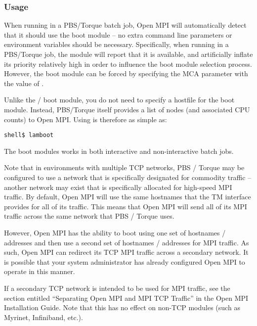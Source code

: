 
\subsubsection{Usage}

When running in a PBS/Torque batch job, Open MPI will automatically detect
that it should use the  boot module -- no extra command line
parameters or environment variables should be necessary.
%
Specifically, when running in a PBS/Torque job, the  module
will report that it is available, and artificially inflate its
priority relatively high in order to influence the boot module
selection process.
%
However, the  boot module can be forced by specifying the
 MCA parameter with the value of .

Unlike the / boot module, you do not need to specify
a hostfile for the  boot module.  Instead, PBS/Torque itself
provides a list of nodes (and associated CPU counts) to Open MPI.  Using
 is therefore as simple as:

\lstset{style=lam-cmdline}
\begin{lstlisting}
shell$ lamboot
\end{lstlisting}

The  boot modules works in both interactive and
non-interactive batch jobs.


Note that in environments with multiple TCP networks, PBS / Torque may
be configured to use a network that is specifically designated for
commodity traffic -- another network may exist that is specifically
allocated for high-speed MPI traffic.  By default, Open MPI will use the
same hostnames that the TM interface provides for all of its traffic.
This means that Open MPI will send all of its MPI traffic across the same
network that PBS / Torque uses.

However, Open MPI has the ability to boot using one set of hostnames /
addresses and then use a second set of hostnames / addresses for MPI
traffic.  As such, Open MPI can redirect its TCP MPI traffic across a
secondary network.  It is possible that your system administrator has
already configured Open MPI to operate in this manner.

If a secondary TCP network is intended to be used for MPI traffic, see
the section entitled ``Separating Open MPI and MPI TCP Traffic'' in the
Open MPI Installation Guide.  Note that this has no effect on non-TCP
 modules (such as Myrinet, Infiniband, etc.).

